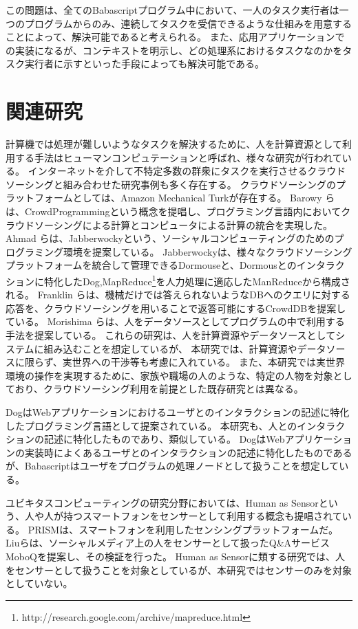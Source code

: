 \documentclass[twoside]{wiss}
\begin{document}
この問題は、全てのBabascriptプログラム中において、一人のタスク実行者は一つのプログラムからのみ、連続してタスクを受信できるような仕組みを用意することによって、解決可能であると考えられる。
また、応用アプリケーションでの実装になるが、コンテキストを明示し、どの処理系におけるタスクなのかをタスク実行者に示すといった手段によっても解決可能である。

\section{関連研究}

計算機では処理が難しいようなタスクを解決するために、人を計算資源として利用する手法はヒューマンコンピュテーション\cite{humancomputation}と呼ばれ、様々な研究が行われている。
インターネットを介して不特定多数の群衆にタスクを実行させるクラウドソーシングと組み合わせた研究事例も多く存在する。
クラウドソーシングのプラットフォームとしては、Amazon Mechanical Turk\cite{mechanicalturk}が存在する。
Barowy らは、CrowdProgrammingという概念を提唱し、プログラミング言語内においてクラウドソーシングによる計算とコンピュータによる計算の統合を実現した\cite{automan}。
Ahmad らは、Jabberwocky\cite{jabberwocky}という、ソーシャルコンピューティングのためのプログラミング環境を提案している。
Jabberwockyは、様々なクラウドソーシングプラットフォームを統合して管理できるDormouseと、Dormousとのインタラクションに特化したDog,MapReduce\footnote{http://research.google.com/archive/mapreduce.html}を人力処理に適応したManReduceから構成される。
Franklin らは、機械だけでは答えられないようなDBへのクエリに対する応答を、クラウドソーシングを用いることで返答可能にするCrowdDBを提案している\cite{crowddb}。
Morishima らは、人をデータソースとしてプログラムの中で利用する手法を提案している\cite{cylog}。
これらの研究は、人を計算資源やデータソースとしてシステムに組み込むことを想定しているが、
本研究では、計算資源やデータソースに限らず、実世界への干渉等も考慮に入れている。
また、本研究では実世界環境の操作を実現するために、家族や職場の人のような、特定の人物を対象としており、クラウドソーシング利用を前提とした既存研究とは異なる。

Dog\cite{dog}はWebアプリケーションにおけるユーザとのインタラクションの記述に特化したプログラミング言語として提案されている。
本研究も、人とのインタラクションの記述に特化したものであり、類似している。
DogはWebアプリケーションの実装時によくあるユーザとのインタラクションの記述に特化したものであるが、Babascriptはユーザをプログラムの処理ノードとして扱うことを想定している。

ユビキタスコンピューティングの研究分野においては、Human as Sensorという、人や人が持つスマートフォンをセンサーとして利用する概念も提唱されている。
PRISMは、スマートフォンを利用したセンシングプラットフォームだ\cite{prism}。
Liuらは、ソーシャルメディア上の人をセンサーとして扱ったQ\&AサービスMoboQを提案し、その検証を行った。
Human as Sensorに類する研究では、人をセンサーとして扱うことを対象としているが、本研究ではセンサーのみを対象としていない。
\end{document}
